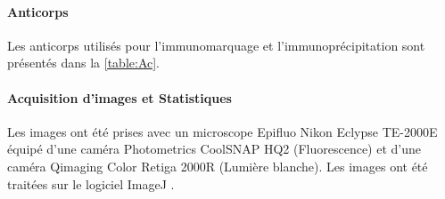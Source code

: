 	\paragraph{Anticorps}
	\label{par:anticorps}
	Les anticorps utilisés pour l'immunomarquage et l'immunoprécipitation sont présentés dans la \cref{table:Ac}.

	\begin{table}[h]
	\end{table} 
\FloatBarrier
	
\paragraph{Acquisition d'images et Statistiques}
\label{par:ImagesStats}
	Les images ont été prises avec un microscope Epifluo Nikon Eclypse TE-2000E équipé d'une caméra Photometrics CoolSNAP HQ2 (Fluorescence) et d'une caméra Qimaging Color Retiga 2000R (Lumière blanche).
	Les images ont été traitées sur le logiciel ImageJ \cite{Schneider2012}.